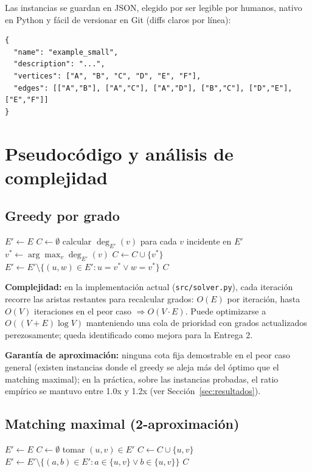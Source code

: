 \documentclass[11pt,a4paper]{article}
\begin{document}
Las instancias se guardan en JSON, elegido por ser legible por humanos, nativo en Python y
fácil de versionar en Git (diffs claros por línea):

\begin{lstlisting}
{
  "name": "example_small",
  "description": "...",
  "vertices": ["A", "B", "C", "D", "E", "F"],
  "edges": [["A","B"], ["A","C"], ["A","D"], ["B","C"], ["D","E"], ["E","F"]]
}
\end{lstlisting}

\section{Pseudocódigo y análisis de complejidad}

\subsection{Greedy por grado}
\begin{algorithm}[H]
\caption{\texttt{greedy\_degree\_vertex\_cover}}
\begin{algorithmic}[1]
\State $E' \gets E$ 
\State $C \gets \emptyset$
	\State calcular $\deg_{E'}(v)$ para cada $v$ incidente en $E'$
	\State $v^{*} \gets \arg\max_v \deg_{E'}(v)$
	\State $C \gets C \cup \{v^{*}\}$
	\State $E' \gets E' \setminus \{(u,w) \in E' : u = v^{*} \lor w = v^{*}\}$
\EndWhile
\State \Return $C$
\end{algorithmic}
\end{algorithm}

\textbf{Complejidad:} en la implementación actual (\texttt{src/solver.py}), cada iteración
recorre las aristas restantes para recalcular grados: $O(E)$ por iteración, hasta $O(V)$
iteraciones en el peor caso $\Rightarrow O(V \cdot E)$. Puede optimizarse a
$O((V+E)\log V)$ manteniendo una cola de prioridad con grados actualizados perezosamente;
queda identificado como mejora para la Entrega 2.

\textbf{Garantía de aproximación:} ninguna cota fija demostrable en el peor caso general
(existen instancias donde el greedy se aleja más del óptimo que el matching maximal);
en la práctica, sobre las instancias probadas, el ratio empírico se mantuvo entre 1.0x y
1.2x (ver Sección~\ref{sec:resultados}).

\subsection{Matching maximal (2-aproximación)}
\begin{algorithm}[H]
\caption{\texttt{maximal\_matching\_vertex\_cover}}
\begin{algorithmic}[1]
\State $E' \gets E$
\State $C \gets \emptyset$
	\State tomar $(u,v) \in E'$ 
	\State $C \gets C \cup \{u, v\}$
	\State $E' \gets E' \setminus \{(a,b) \in E' : a \in \{u,v\} \lor b \in \{u,v\}\}$
\EndWhile
\State \Return $C$
\end{algorithmic}
\end{algorithm}
\end{document}
